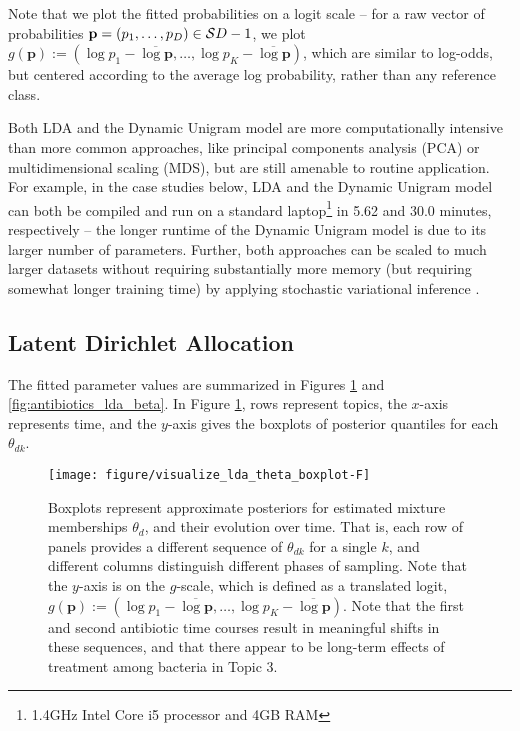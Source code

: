 \documentclass[oupdraft]{bio}
\begin{document}
Note that we plot the fitted probabilities on a logit scale -- for a raw vector
of probabilities $\mathbf{p} = \left(p_{1}, \dots, p_{D}\right) \in
\mathcal{S}{D - 1}$, we plot $g\left(\mathbf{p}\right) := \left(\log p_{1} -
\overline{\log \mathbf{p}}, \dots, \log p_{K} - \overline{\log
  \mathbf{p}}\right)$, which are similar to log-odds, but centered according to
the average log probability, rather than any reference class.

Both LDA and the Dynamic Unigram model are more computationally intensive than
more common approaches, like principal components analysis (PCA) or
multidimensional scaling (MDS), but are still amenable to routine application.
For example, in the case studies below, LDA and the Dynamic Unigram model can
both be compiled and run on a standard laptop\footnote{1.4GHz Intel Core i5
  processor and 4GB RAM} in 5.62 and 30.0 minutes, respectively -- the longer
runtime of the Dynamic Unigram model is due to its larger number of parameters.
Further, both approaches can be scaled to much larger datasets without requiring
substantially more memory (but requiring somewhat longer training time) by
applying stochastic variational inference \citep{hoffman2013stochastic,
  kucukelbir2015automatic}.

\subsection{Latent Dirichlet Allocation}
\label{sec:antibiotics_lda}

The fitted parameter values are summarized in Figures
\ref{fig:antibiotics_lda_theta} and \ref{fig:antibiotics_lda_beta}.
In Figure \ref{fig:antibiotics_lda_theta}, rows represent topics, the $x$-axis
represents time, and the $y$-axis gives the boxplots of posterior quantiles for
each $\theta_{dk}$.

\begin{figure}[!p]
  \centering\texttt{[image: figure/visualize\_lda\_theta\_boxplot-F]}
  \caption{Boxplots represent approximate posteriors for estimated mixture
    memberships $\theta_{d}$, and their evolution over time. That is, each row
    of panels provides a different sequence of $\theta_{dk}$ for a single $k$,
    and different columns distinguish different phases of sampling. Note that
    the $y$-axis is on the $g$-scale, which is defined as a translated logit,
    $g\left(\mathbf{p}\right) := \left(\log p_{1} - \overline{\log \mathbf{p}},
    \dots,\log p_{K} - \overline{\log \mathbf{p}}\right)$. Note that the first
    and second antibiotic time courses result in meaningful shifts in these
    sequences, and that there appear to be long-term effects of treatment among
    bacteria in Topic 3. \label{fig:antibiotics_lda_theta}}
\end{figure}
\end{document}
